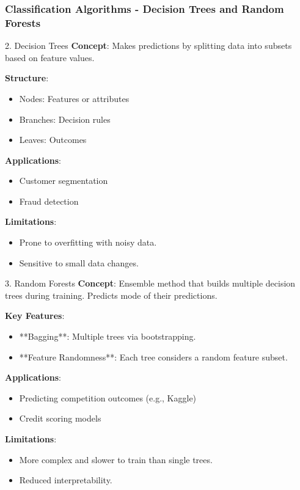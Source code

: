 \documentclass[aspectratio=169]{beamer}
\begin{document}
\begin{frame}[fragile]
    \frametitle{Classification Algorithms - Decision Trees and Random Forests}
    \begin{block}{2. Decision Trees}
        \textbf{Concept}: Makes predictions by splitting data into subsets based on feature values.

        \textbf{Structure}:
        \begin{itemize}
            \item Nodes: Features or attributes
            \item Branches: Decision rules
            \item Leaves: Outcomes
        \end{itemize}
        
        \textbf{Applications}:
        \begin{itemize}
            \item Customer segmentation
            \item Fraud detection
        \end{itemize}
        
        \textbf{Limitations}:
        \begin{itemize}
            \item Prone to overfitting with noisy data.
            \item Sensitive to small data changes.
        \end{itemize}
    \end{block}

    \vspace{1em}
    
    \begin{block}{3. Random Forests}
        \textbf{Concept}: Ensemble method that builds multiple decision trees during training. Predicts mode of their predictions.
        
        \textbf{Key Features}:
        \begin{itemize}
            \item **Bagging**: Multiple trees via bootstrapping.
            \item **Feature Randomness**: Each tree considers a random feature subset.
        \end{itemize}

        \textbf{Applications}:
        \begin{itemize}
            \item Predicting competition outcomes (e.g., Kaggle)
            \item Credit scoring models
        \end{itemize}
        
        \textbf{Limitations}:
        \begin{itemize}
            \item More complex and slower to train than single trees.
            \item Reduced interpretability.
        \end{itemize}
    \end{block}
\end{frame}
\end{document}
